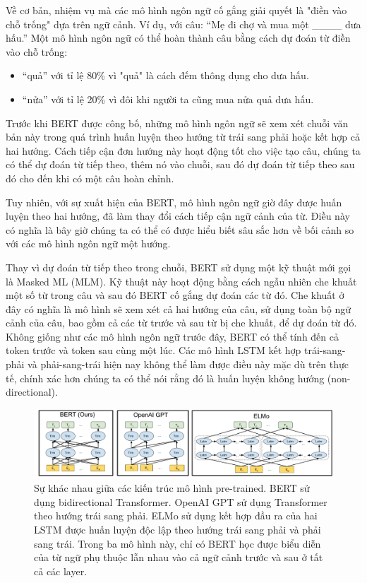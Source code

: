 Về cơ bản, nhiệm vụ mà các mô hình ngôn ngữ cố gắng giải quyết là  "điền vào chỗ trống" dựa trên ngữ cảnh. Ví dụ, với câu: ``Mẹ đi chợ và mua một \_\_\_\_ dưa hấu.''
Một mô hình ngôn ngữ có thể hoàn thành câu bằng cách dự đoán từ điền vào chỗ trống:

\begin{itemize}
    \item ``quả'' với tỉ lệ 80\% vì "quả" là cách đếm thông dụng cho dưa hấu.
    \item ``nửa'' với tỉ lệ 20\% vì đôi khi người ta cũng mua nửa quả dưa hấu.
\end{itemize}

Trước khi BERT được công bố, những mô hình ngôn ngữ sẽ xem xét chuỗi văn bản này trong quá trình huấn luyện theo hướng từ trái sang phải hoặc kết hợp cả hai hướng. Cách tiếp cận đơn hướng này hoạt động tốt cho việc tạo câu, chúng ta có thể dự đoán từ tiếp theo, thêm nó vào chuỗi, sau đó dự đoán từ tiếp theo sau đó cho đến khi có một câu hoàn chỉnh.

Tuy nhiên, với sự xuất hiện của BERT, mô hình ngôn ngữ giờ đây được huấn luyện theo hai hướng, đã làm thay đổi cách tiếp cận ngữ cảnh của từ. Điều này có nghĩa là bây giờ chúng ta có thể có được hiểu biết sâu sắc hơn về bối cảnh so với các mô hình ngôn ngữ một hướng.

Thay vì dự đoán từ tiếp theo trong chuỗi, BERT sử dụng một kỹ thuật mới gọi là Masked ML (MLM). Kỹ thuật này hoạt động bằng cách ngẫu nhiên che khuất một số từ trong câu và sau đó BERT cố gắng dự đoán các từ đó. Che khuất ở đây có nghĩa là mô hình sẽ xem xét cả hai hướng của câu, sử dụng toàn bộ ngữ cảnh của câu, bao gồm cả các từ trước và sau từ bị che khuất, để dự đoán từ đó. Không giống như các mô hình ngôn ngữ trước đây, BERT có thể tính đến cả token trước và token sau cùng một lúc. Các mô hình LSTM kết hợp trái-sang-phải và phải-sang-trái hiện nay không thể làm được điều này mặc dù trên thực tế, chính xác hơn chúng ta có thể nói rằng đó là huấn luyện không hướng (non-directional).

\begin{figure}[htb]
    \centering
    \includegraphics[width=\textwidth]{image/BERT_comparisons.pdf}
    \caption{Sự khác nhau giữa các kiến trúc mô hình pre-trained. BERT sử dụng bidirectional Transformer. OpenAI GPT sử dụng Transformer theo hướng trái sang phải. ELMo sử dụng kết hợp đầu ra của hai LSTM được huấn luyện độc lập theo hướng trái sang phải và phải sang trái. Trong ba mô hình này, chỉ có BERT học được biểu diễn của từ ngữ phụ thuộc lẫn nhau vào cả ngữ cảnh trước và sau ở tất cả các layer.}
    \label{figure:BERT_comparisons}
\end{figure}

